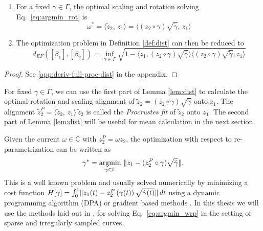 \begin{lemma}
  \label{lem:dist}
  \begin{enumerate}[label=\emph{\roman*.)}]
    \item For a fixed $\gamma \in \Gamma$, the optimal scaling and rotation solving Eq.\ \ref{eq:argmin_rot} is 
      $$ \omega^* = \langle \widetilde z_2,\, z_1 \rangle = \langle (z_2 \circ \gamma) \sqrt{\dot\gamma},\, z_1 \rangle$$
    \item The optimization problem in Definition \ref{def:dist} can then be reduced to
      $$ d_{EF}([\beta_1],[\beta_2]) = \inf_{\gamma \in \Gamma} \sqrt{ 1 - \langle z_1, (z_2 \circ \gamma) \sqrt{\dot\gamma} \rangle \langle (z_2 \circ \gamma) \sqrt{\dot\gamma}, z_1 \rangle }$$
  \end{enumerate}
  \begin{proof}
  See \ref{app:deriv-full-proc-dist} in the appendix.
  \end{proof}
\end{lemma}
\begin{remark}
  For fixed $\gamma \in \Gamma$, we can use the first part of Lemma \ref{lem:dist} to calculate the optimal rotation and scaling alignment of $\widetilde z_2 = (z_2 \circ \gamma) \sqrt{\dot\gamma}$ onto $z_1$. The alignment $\widetilde z_2^P = \langle \widetilde z_2,\, z_1 \rangle \, \widetilde z_2$ is called the \emph{Procrustes fit} of $\widetilde z_2$ onto $z_1$. The second part of Lemma \ref{lem:dist} will be useful for mean calculation in the next section.
\end{remark}
Given the current $\omega \in \mathbb{C}$ with $z_2^P = \omega z_2$, the optimization with respect to re-parametrization can be written as
\begin{equation}
  \label{eq:argmin_wrp}
  \gamma^* = \operatorname*{argmin}_{\gamma \in \Gamma}\,\, \lVert z_1 - (z_2^P \circ \gamma) \sqrt{\dot\gamma}\rVert.
\end{equation}
This is a well known problem and usually solved numerically by minimizing a cost function $H[\gamma] = \int_0^1 \lVert z_1(t) - z_2^P\left( \gamma(t) \right) \sqrt{\dot\gamma(t)}\rVert\, dt$ using a dynamic programming algorithm (DPA) or gradient based methods \parencite[see][]{SrivastavaEtAl2011}.
In this thesis we will use the methods laid out in \cite{Steyer2021}, for solving Eq.\ \ref{eq:argmin_wrp} in the setting of sparse and irregularly sampled curves.


